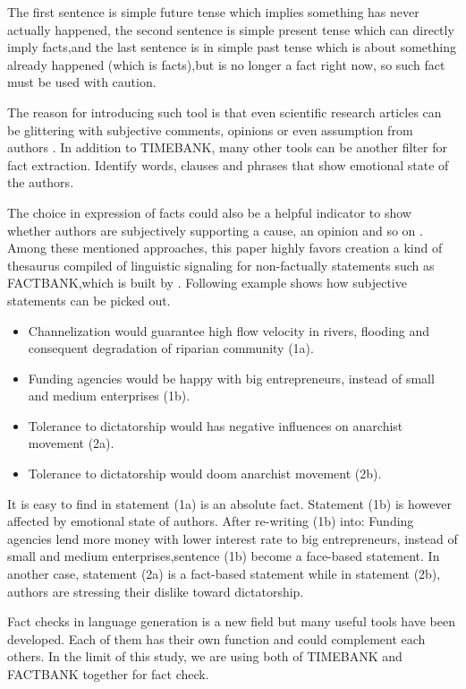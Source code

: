 The first sentence is simple future tense which implies something has never actually happened, the second sentence is simple present tense which can directly imply facts,and the last sentence is in simple past tense which is about something already happened (which is facts),but is no longer a fact right now, so such fact must be used with caution. 

The reason for introducing such tool is that even scientific research articles can be glittering with subjective comments, opinions or even assumption from authors \cite{schultze2000confessional}. 
In addition to TIMEBANK, many other tools can be another filter for fact extraction. 
\cite{Dave2003mining} Identify words, clauses and phrases that show emotional state of the authors. 

The choice in expression of facts could also be a helpful indicator to show whether authors are subjectively supporting a cause, an opinion and so on \cite{Wiebe2005}. 
Among these mentioned approaches, this paper highly favors creation a kind of thesaurus compiled of linguistic signaling for non-factually statements such as FACTBANK,which is built by \cite{Sauri2009}. 
Following example shows how subjective statements can be picked out.

\begin{itemize}
	\item Channelization would guarantee high flow velocity in rivers, flooding and consequent degradation of riparian community (1a).
	\item Funding agencies would be happy with big entrepreneurs, instead of small and medium enterprises (1b).
	\item Tolerance to dictatorship would has negative influences on anarchist movement (2a).
	\item Tolerance to dictatorship would doom anarchist movement (2b).
\end{itemize}

It is easy to find in statement (1a) is an absolute fact. 
Statement (1b) is however affected by emotional state of authors. 
After re-writing (1b) into: Funding agencies lend more money with lower interest rate to big entrepreneurs, instead of small 
and medium enterprises,sentence (1b) become a face-based statement. 
In another case, statement (2a) is a fact-based statement while in statement (2b), authors are stressing their dislike toward dictatorship.

Fact checks in language generation is a new field but many useful tools have been developed. 
Each of them has their own function and could complement each others. 
In the limit of this study, we are using both of TIMEBANK and FACTBANK together for fact check.



